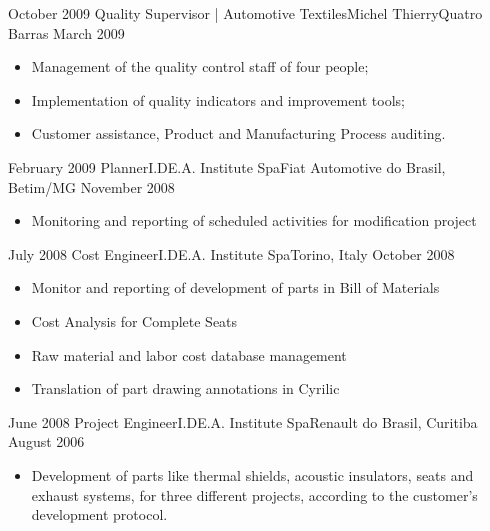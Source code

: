 \begin{experiences}
  \emptySeparator\experience
    {October 2009}     {Quality Supervisor | Automotive Textiles}{Michel Thierry}{Quatro Barras}
    {March 2009}    {
                      \begin{itemize}
                        \item Management of the quality control staff of four people;
                        \item Implementation of quality indicators and improvement tools;
                        \item Customer assistance, Product and Manufacturing Process auditing.
                      \end{itemize}
                    }
                
  \emptySeparator
  \experience
  {February 2009}       {Planner}{I.DE.A. Institute Spa}{Fiat Automotive do Brasil, Betim/MG}
  {November 2008}   {
                        \begin{itemize}
                            \item Monitoring and reporting of scheduled activities for modification project                       
                        \end{itemize}
                    }
                
  \emptySeparator
  \experience
  {July 2008}      {Cost Engineer}{I.DE.A. Institute Spa}{Torino, Italy}
  {October 2008}       {
                      \begin{itemize}
                          \item Monitor and reporting of development of parts in Bill of Materials
                          \item Cost Analysis for Complete Seats
                          \item Raw material and labor cost database management
                          \item Translation of part drawing annotations in Cyrilic
                      \end{itemize}
                    }
                
  \emptySeparator   
  \experience
  {June 2008}    {Project Engineer}{I.DE.A. Institute Spa}{Renault do Brasil, Curitiba}
  {August 2006}    {
                      \begin{itemize}
                          \item Development of parts like thermal shields, acoustic insulators, seats and exhaust systems, for three different projects, according to the customer's development protocol. 
                      \end{itemize}
                
}
\end{experiences}
